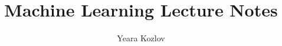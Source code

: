 \graphicspath{{machine_learning/ml/}}




\title{Machine Learning Lecture Notes}
\author{Yeara Kozlov}
\date{}

\maketitle

\tableofcontents
\cleardoublepage




